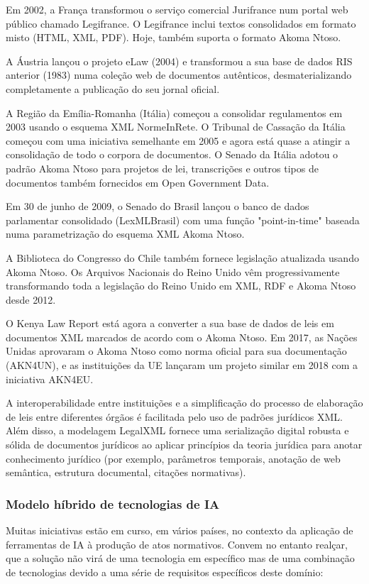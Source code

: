 Em 2002, a França transformou o serviço comercial Jurifrance num portal web público chamado Legifrance. 
O Legifrance inclui textos consolidados em formato misto (HTML, XML, PDF). Hoje, também suporta o formato Akoma Ntoso.

A Áustria lançou o projeto eLaw (2004) e transformou a sua base de dados RIS anterior (1983) numa coleção web de documentos 
autênticos, desmaterializando completamente a publicação do seu jornal oficial. 

A Região da Emília-Romanha (Itália) começou a consolidar regulamentos em 2003 usando o esquema XML NormeInRete. 
O Tribunal de Cassação da Itália começou com uma iniciativa semelhante em 2005 e agora está 
quase a atingir a consolidação de todo o corpora de documentos. 
O Senado da Itália adotou o padrão Akoma Ntoso para projetos de lei, transcrições e outros tipos de documentos também 
fornecidos em Open Government Data.

Em 30 de junho de 2009, o Senado do Brasil lançou o banco de dados parlamentar consolidado (LexMLBrasil) com uma função 
"point-in-time" baseada numa parametrização do esquema XML Akoma Ntoso. 

A Biblioteca do Congresso do Chile também fornece legislação atualizada usando Akoma Ntoso. 
Os Arquivos Nacionais do Reino Unido vêm progressivamente transformando toda a legislação do Reino Unido em XML, RDF e 
Akoma Ntoso desde 2012. 

O Kenya Law Report está agora a converter a sua base de dados de leis em documentos XML marcados de acordo com o Akoma Ntoso. 
Em 2017, as Nações Unidas aprovaram o Akoma Ntoso como norma oficial para sua documentação (AKN4UN), e as instituições da UE 
lançaram um projeto similar em 2018 com a iniciativa AKN4EU.

A interoperabilidade entre instituições e a simplificação do processo de elaboração de leis entre diferentes órgãos é facilitada 
pelo uso de padrões jurídicos XML. 
Além disso, a modelagem LegalXML fornece uma serialização digital robusta e sólida de documentos jurídicos ao aplicar 
princípios da teoria jurídica para anotar conhecimento jurídico (por exemplo, parâmetros temporais, anotação de web semântica, 
estrutura documental, citações normativas).

\subsubsection{Modelo híbrido de tecnologias de IA}

Muitas iniciativas estão em curso, em vários países, no contexto da aplicação de ferramentas de IA à produção de atos 
normativos. Convem no entanto realçar, que a solução não virá de uma tecnologia em específico mas de uma combinação de 
tecnologias devido a uma série de requisitos específicos deste domínio:


